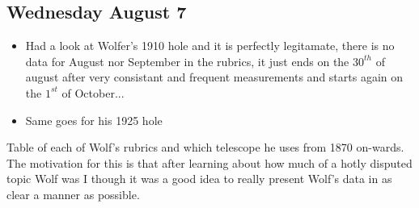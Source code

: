 \documentclass[12pt]{article}
\begin{document}
\subsection{Wednesday August 7}
\begin{itemize}
    \item Had a look at Wolfer's 1910 hole and it is perfectly legitamate, there is no data for August nor September in the rubrics, it just ends on the $30^{th}$ of august after very consistant and frequent measurements and starts again on the $1^{st}$ of October...
    \item Same goes for his 1925 hole
\end{itemize}

Table of each of Wolf's rubrics and which telescope he uses from 1870 on-wards. The motivation for this is that after learning about how much of a hotly disputed topic Wolf was I though it was a good idea to really present Wolf's data in as clear a manner as possible.\\
\end{document}
